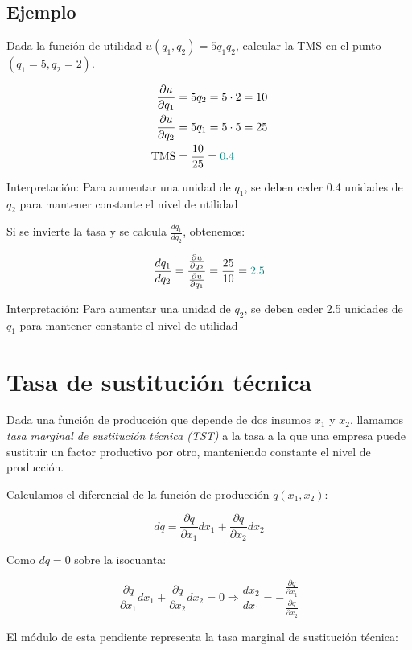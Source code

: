 \documentclass{article}
\begin{document}
\subsection*{Ejemplo}

Dada la función de utilidad \( u(q_1, q_2) = 5q_1 q_2 \), calcular la TMS en el punto \( (q_1 = 5, q_2 = 2) \).

\begin{align*}
\frac{\partial u}{\partial q_1} &= 5q_2 = 5 \cdot 2 = 10 \\
\frac{\partial u}{\partial q_2} &= 5q_1 = 5 \cdot 5 = 25 \\
\text{TMS} &= \frac{10}{25} = {\color{teal}0.4}
\end{align*}

{\color{teal}Interpretación: Para aumentar una unidad de \( q_1 \), se deben ceder 0.4 unidades de \( q_2 \) para mantener constante el nivel de utilidad}

Si se invierte la tasa y se calcula \( \frac{dq_1}{dq_2} \), obtenemos:

\[
\frac{dq_1}{dq_2} = \frac{\frac{\partial u}{\partial q_2}}{\frac{\partial u}{\partial q_1}} = \frac{25}{10} = {\color{teal}2.5}
\]

{\color{teal}Interpretación: Para aumentar una unidad de \( q_2 \), se deben ceder 2.5 unidades de \( q_1 \) para mantener constante el nivel de utilidad}

\section*{Tasa de sustitución técnica}
Dada una función de producción que depende de dos insumos \( x_1 \) y \( x_2 \), llamamos \textit{tasa marginal de sustitución técnica (TST)} a la tasa a la que una empresa puede sustituir un factor productivo por otro, manteniendo constante el nivel de producción.

Calculamos el diferencial de la función de producción \( q(x_1, x_2) \):

\[
dq = \frac{\partial q}{\partial x_1} dx_1 + \frac{\partial q}{\partial x_2} dx_2
\]

Como \( dq = 0 \) sobre la isocuanta:

\[
\frac{\partial q}{\partial x_1} dx_1 + \frac{\partial q}{\partial x_2} dx_2 = 0
\Rightarrow
\frac{dx_2}{dx_1} = - \frac{\frac{\partial q}{\partial x_1}}{\frac{\partial q}{\partial x_2}}
\]

El módulo de esta pendiente representa la tasa marginal de sustitución técnica:
\end{document}
